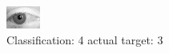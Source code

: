 \begin{figure}[h!]
\begin{center}
\includegraphics[width=0.60\columnwidth]{figures/ID2827_class_4_target_3.png}
\end{center}
\caption{ Classification: 4 actual target: 3}
\label{fig:ID2827_class_4_target_3}
\end{figure}
